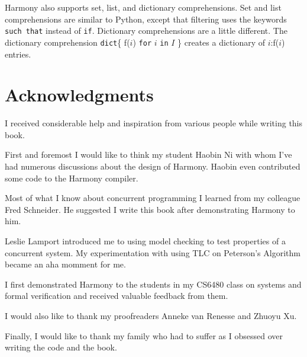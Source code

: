 \documentclass{report}
\begin{document}
Harmony also supports set, list, and dictionary comprehensions.
%
Set and list comprehensions are similar to Python, except that filtering uses
the keywords \texttt{such that} instead of \texttt{if}.
Dictionary comprehensions are a little different.
The dictionary comprehension \texttt{dict}\{ f($i$) \texttt{for} $i$ \texttt{in} $I$ \}
creates a dictionary of $i$:f($i$) entries.

\cleardoublepage
{}
{}
\chapter*{Acknowledgments}

I received considerable help and inspiration from various people
while writing this book.

First and foremost I would like to think my student Haobin Ni with
whom I've had numerous discussions about the design of Harmony.
Haobin even contributed some code to the Harmony compiler.

Most of what I know about concurrent programming I learned from
my colleague Fred Schneider.  He suggested I write this book after
demonstrating Harmony to him.

Leslie Lamport introduced me to using model checking to test properties
of a concurrent system.  My experimentation with using TLC on Peterson's
Algorithm became an aha momment for me.

I first demonstrated Harmony to the students in my CS6480 class on systems
and formal verification and
received valuable feedback from them.

I would also like to thank my proofreaders Anneke van Renesse and
Zhuoyu Xu.

Finally, I would like to thank my family who had to suffer as I obsessed
over writing the code and the book.


\cleardoublepage
{}
\printindex

\cleardoublepage
{}
\printglossaries
\end{document}
